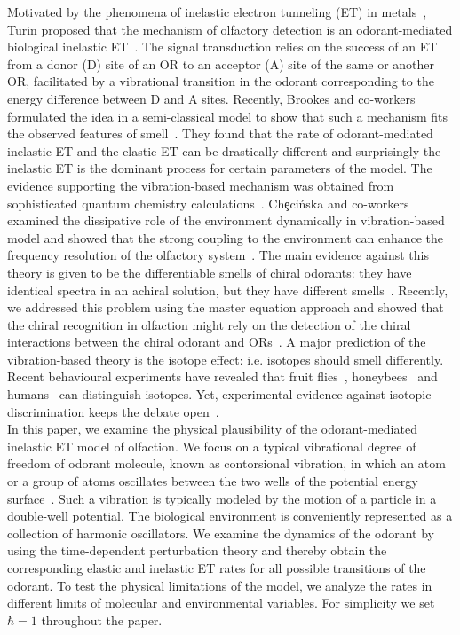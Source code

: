 \documentclass[aps,prl,tightenlines,onecolumn,superscriptaddress]{revtex4}
\begin{document}
Motivated by the phenomena of inelastic electron tunneling (ET) in metals~\cite{Lam,Adk}, Turin proposed that the mechanism of olfactory detection is an odorant-mediated biological inelastic ET~\cite{Tur2}. The signal transduction relies on the success of an ET from a donor (D) site of an OR to an acceptor (A) site of the same or another OR, facilitated by a vibrational transition in the odorant corresponding to the energy difference between D and A sites. Recently, Brookes and co-workers formulated the idea in a semi-classical model to show that such a mechanism fits the observed features of smell~\cite{Bro}. They found that the rate of odorant-mediated inelastic ET and the elastic ET can be drastically different and surprisingly the inelastic ET is the dominant process for certain parameters of the model. The evidence supporting the vibration-based mechanism was obtained from sophisticated quantum chemistry calculations~\cite{Sol,Bit}. Ch\c{e}ci\'{n}ska and co-workers examined the dissipative role of the environment dynamically in vibration-based model and showed that the strong coupling to the environment can enhance the frequency resolution of the olfactory system~\cite{Che}. The main evidence against this theory is given to be the differentiable smells of chiral odorants: they have identical spectra in an achiral solution, but they have different smells~\cite{Ben}. Recently, we addressed this problem using the master equation approach and showed that the chiral recognition in olfaction might rely on the detection of the chiral interactions between the chiral odorant and ORs~\cite{Tir}. A major prediction of the vibration-based theory is the isotope effect: i.e. isotopes should smell differently. Recent behavioural experiments have revealed that fruit flies~\cite{Fra,Bitt}, honeybees~\cite{Gro} and humans~\cite{Haf,Gan} can distinguish isotopes. Yet, experimental evidence against isotopic discrimination keeps the debate open~\cite{Kel,Blo}.\\
\indent In this paper, we examine the physical plausibility of the odorant-mediated inelastic ET model of olfaction. We focus on a typical vibrational degree of freedom of odorant molecule, known as contorsional vibration, in which an atom or a group of atoms oscillates between the two wells of the potential energy surface~\cite{Tow}. Such a vibration is typically modeled by the motion of a particle in a double-well potential. The biological environment is conveniently represented as a collection of harmonic oscillators. We examine the dynamics of the odorant by using the time-dependent perturbation theory and thereby obtain the corresponding elastic and inelastic ET rates for all possible transitions of the odorant. To test the physical limitations of the model, we analyze the rates in different limits of molecular and environmental variables. For simplicity we set $\hbar=1$ throughout the paper.
\end{document}

